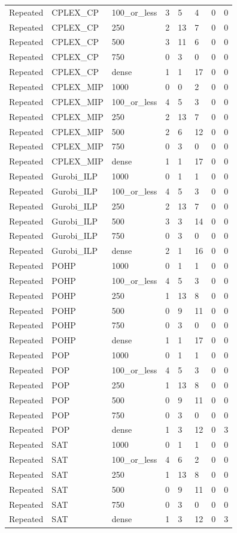 \begin{table}[htbp]
\begin{tabular}{llllllll}
Repeated & CPLEX\_CP & 100\_or\_less & 3 & 5 & 4 & 0 & 0 \\
Repeated & CPLEX\_CP & 250 & 2 & 13 & 7 & 0 & 0 \\
Repeated & CPLEX\_CP & 500 & 3 & 11 & 6 & 0 & 0 \\
Repeated & CPLEX\_CP & 750 & 0 & 3 & 0 & 0 & 0 \\
Repeated & CPLEX\_CP & dense & 1 & 1 & 17 & 0 & 0 \\
Repeated & CPLEX\_MIP & 1000 & 0 & 0 & 2 & 0 & 0 \\
Repeated & CPLEX\_MIP & 100\_or\_less & 4 & 5 & 3 & 0 & 0 \\
Repeated & CPLEX\_MIP & 250 & 2 & 13 & 7 & 0 & 0 \\
Repeated & CPLEX\_MIP & 500 & 2 & 6 & 12 & 0 & 0 \\
Repeated & CPLEX\_MIP & 750 & 0 & 3 & 0 & 0 & 0 \\
Repeated & CPLEX\_MIP & dense & 1 & 1 & 17 & 0 & 0 \\
Repeated & Gurobi\_ILP & 1000 & 0 & 1 & 1 & 0 & 0 \\
Repeated & Gurobi\_ILP & 100\_or\_less & 4 & 5 & 3 & 0 & 0 \\
Repeated & Gurobi\_ILP & 250 & 2 & 13 & 7 & 0 & 0 \\
Repeated & Gurobi\_ILP & 500 & 3 & 3 & 14 & 0 & 0 \\
Repeated & Gurobi\_ILP & 750 & 0 & 3 & 0 & 0 & 0 \\
Repeated & Gurobi\_ILP & dense & 2 & 1 & 16 & 0 & 0 \\
Repeated & POHP & 1000 & 0 & 1 & 1 & 0 & 0 \\
Repeated & POHP & 100\_or\_less & 4 & 5 & 3 & 0 & 0 \\
Repeated & POHP & 250 & 1 & 13 & 8 & 0 & 0 \\
Repeated & POHP & 500 & 0 & 9 & 11 & 0 & 0 \\
Repeated & POHP & 750 & 0 & 3 & 0 & 0 & 0 \\
Repeated & POHP & dense & 1 & 1 & 17 & 0 & 0 \\
Repeated & POP & 1000 & 0 & 1 & 1 & 0 & 0 \\
Repeated & POP & 100\_or\_less & 4 & 5 & 3 & 0 & 0 \\
Repeated & POP & 250 & 1 & 13 & 8 & 0 & 0 \\
Repeated & POP & 500 & 0 & 9 & 11 & 0 & 0 \\
Repeated & POP & 750 & 0 & 3 & 0 & 0 & 0 \\
Repeated & POP & dense & 1 & 3 & 12 & 0 & 3 \\
Repeated & SAT & 1000 & 0 & 1 & 1 & 0 & 0 \\
Repeated & SAT & 100\_or\_less & 4 & 6 & 2 & 0 & 0 \\
Repeated & SAT & 250 & 1 & 13 & 8 & 0 & 0 \\
Repeated & SAT & 500 & 0 & 9 & 11 & 0 & 0 \\
Repeated & SAT & 750 & 0 & 3 & 0 & 0 & 0 \\
Repeated & SAT & dense & 1 & 3 & 12 & 0 & 3 \\
\hline
\end{tabular}
\end{table}
